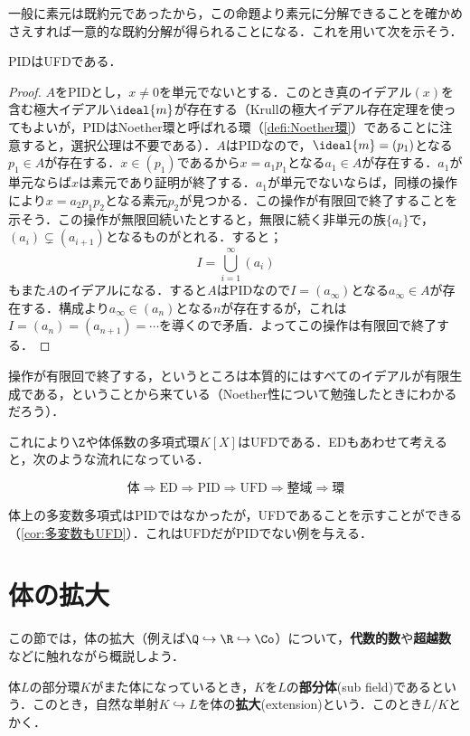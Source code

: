 一般に素元は既約元であったから，この命題より素元に分解できることを確かめさえすれば一意的な既約分解が得られることになる．これを用いて次を示そう．
\begin{thm}
	PIDはUFDである．
\end{thm}

\begin{proof}
	$A$をPIDとし，$x\neq0$を単元でないとする．このとき真のイデアル$(x)$を含む極大イデアル$\ideal{m}$が存在する（Krullの極大イデアル存在定理を使ってもよいが，PIDはNoether環と呼ばれる環（\ref{defi:Noether環}）であることに注意すると，選択公理は不要である）．$A$はPIDなので，$\ideal{m}=(p_1)$となる$p_1\in A$が存在する．$x\in(p_1)$であるから$x=a_1p_1$となる$a_1\in A$が存在する．$a_1$が単元ならば$x$は素元であり証明が終了する．$a_1$が単元でないならば，同様の操作により$x=a_2p_1p_2$となる素元$p_2$が見つかる．この操作が有限回で終了することを示そう．この操作が無限回続いたとすると，無限に続く非単元の族$\{a_i\}$で，$(a_i)\subsetneq (a_{i+1})$となるものがとれる．すると；
	\[I=\bigcup_{i=1}^\infty (a_i)\]
	もまた$A$のイデアルになる．すると$A$はPIDなので$I=(a_\infty)$となる$a_\infty\in A$が存在する．構成より$a_\infty\in (a_n)$となる$n$が存在するが，これは$I=(a_n)=(a_{n+1})=\cdots$を導くので矛盾．よってこの操作は有限回で終了する．
\end{proof}

操作が有限回で終了する，というところは本質的にはすべてのイデアルが有限生成である，ということから来ている（Noether性について勉強したときにわかるだろう）．

これにより$\Z$や体係数の多項式環$K[X]$はUFDである．EDもあわせて考えると，次のような流れになっている．

\[\text{体}\Longrightarrow\text{ED}\Longrightarrow\text{PID}\Longrightarrow\text{UFD}\Longrightarrow\text{整域}\Longrightarrow\text{環}\]

体上の多変数多項式はPIDではなかったが，UFDであることを示すことができる（\ref{cor:多変数もUFD}）．これはUFDだがPIDでない例を与える．

\section{体の拡大}

この節では，体の拡大（例えば$\Q\hookrightarrow\R\hookrightarrow\Co$）について，\textbf{代数的数}や\textbf{超越数}などに触れながら概説しよう．

体$L$の部分環$K$がまた体になっているとき，$K$を$L$の\textbf{部分体}(sub field)であるという．このとき，自然な単射$K\hookrightarrow L$を体の\textbf{拡大}(extension)という．このとき$L/K$とかく．

